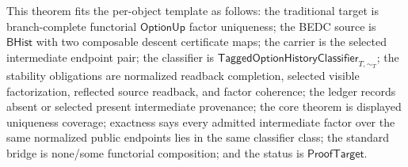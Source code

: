 \begin{theorem}
\label{thm:tagged-option-composite-image-classifier-normalized-unique-intermediate-factor-coverage}
This theorem fits the per-object template as follows: the traditional target is
branch-complete functorial $\mathsf{OptionUp}$ factor uniqueness; the BEDC
source is $\mathsf{BHist}$ with two composable descent certificate maps; the
carrier is the selected intermediate endpoint pair; the classifier is
$\mathsf{TaggedOptionHistoryClassifier}_{T,\sim_T}$; the stability obligations
are normalized readback completion, selected visible factorization, reflected
source readback, and factor coherence; the ledger records absent or selected
present intermediate provenance; the core theorem is displayed uniqueness
coverage; exactness says every admitted intermediate factor over the same
normalized public endpoints lies in the same classifier class; the standard
bridge is none/some functorial composition; and the status is
$\mathsf{ProofTarget}$.


\end{theorem}
